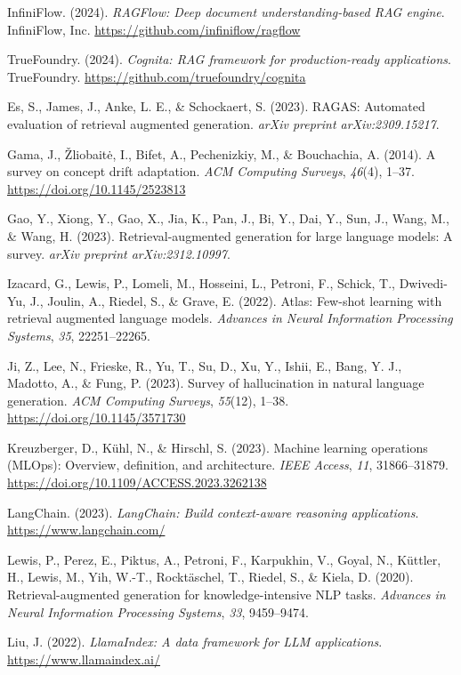 {InfiniFlow. (2024). \textit{RAGFlow: Deep document understanding-based RAG engine}. InfiniFlow, Inc. \url{https://github.com/infiniflow/ragflow}

TrueFoundry. (2024). \textit{Cognita: RAG framework for production-ready applications}. TrueFoundry. \url{https://github.com/truefoundry/cognita}

Es, S., James, J., Anke, L. E., \& Schockaert, S. (2023). RAGAS: Automated evaluation of retrieval augmented generation. \textit{arXiv preprint arXiv:2309.15217}.

Gama, J., \v{Z}liobait\.{e}, I., Bifet, A., Pechenizkiy, M., \& Bouchachia, A. (2014). A survey on concept drift adaptation. \textit{ACM Computing Surveys}, \textit{46}(4), 1--37. \url{https://doi.org/10.1145/2523813}

Gao, Y., Xiong, Y., Gao, X., Jia, K., Pan, J., Bi, Y., Dai, Y., Sun, J., Wang, M., \& Wang, H. (2023). Retrieval-augmented generation for large language models: A survey. \textit{arXiv preprint arXiv:2312.10997}.

Izacard, G., Lewis, P., Lomeli, M., Hosseini, L., Petroni, F., Schick, T., Dwivedi-Yu, J., Joulin, A., Riedel, S., \& Grave, E. (2022). Atlas: Few-shot learning with retrieval augmented language models. \textit{Advances in Neural Information Processing Systems}, \textit{35}, 22251--22265.

Ji, Z., Lee, N., Frieske, R., Yu, T., Su, D., Xu, Y., Ishii, E., Bang, Y. J., Madotto, A., \& Fung, P. (2023). Survey of hallucination in natural language generation. \textit{ACM Computing Surveys}, \textit{55}(12), 1--38. \url{https://doi.org/10.1145/3571730}

Kreuzberger, D., K\"uhl, N., \& Hirschl, S. (2023). Machine learning operations (MLOps): Overview, definition, and architecture. \textit{IEEE Access}, \textit{11}, 31866--31879. \url{https://doi.org/10.1109/ACCESS.2023.3262138}

LangChain. (2023). \textit{LangChain: Build context-aware reasoning applications}. \url{https://www.langchain.com/}

Lewis, P., Perez, E., Piktus, A., Petroni, F., Karpukhin, V., Goyal, N., K{\"u}ttler, H., Lewis, M., Yih, W.-T., Rockt{\"a}schel, T., Riedel, S., \& Kiela, D. (2020). Retrieval-augmented generation for knowledge-intensive NLP tasks. \textit{Advances in Neural Information Processing Systems}, \textit{33}, 9459--9474.

Liu, J. (2022). \textit{LlamaIndex: A data framework for LLM applications}. \url{https://www.llamaindex.ai/}

}
